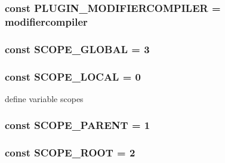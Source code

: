 \subsubsection[{P\+L\+U\+G\+I\+N\+\_\+\+M\+O\+D\+I\+F\+I\+E\+R\+C\+O\+M\+P\+I\+L\+E\+R}]{\setlength{\rightskip}{0pt plus 5cm}const P\+L\+U\+G\+I\+N\+\_\+\+M\+O\+D\+I\+F\+I\+E\+R\+C\+O\+M\+P\+I\+L\+E\+R = \textquotesingle{}modifiercompiler\textquotesingle{}}\label{class_smarty_a6d2292b274afbbc56b46bf0064257c21}
\hypertarget{class_smarty_ab445d8c60ac47e2eade1790d3b5ead7e}{}
\subsubsection[{S\+C\+O\+P\+E\+\_\+\+G\+L\+O\+B\+A\+L}]{\setlength{\rightskip}{0pt plus 5cm}const S\+C\+O\+P\+E\+\_\+\+G\+L\+O\+B\+A\+L = 3}\label{class_smarty_ab445d8c60ac47e2eade1790d3b5ead7e}
\hypertarget{class_smarty_ae96cd6e8d429b91e56cd1914c5b5ce61}{}
\subsubsection[{S\+C\+O\+P\+E\+\_\+\+L\+O\+C\+A\+L}]{\setlength{\rightskip}{0pt plus 5cm}const S\+C\+O\+P\+E\+\_\+\+L\+O\+C\+A\+L = 0}\label{class_smarty_ae96cd6e8d429b91e56cd1914c5b5ce61}
define variable scopes \hypertarget{class_smarty_a8ea89b5e55b135aa28fcccba189e3bca}{}
\subsubsection[{S\+C\+O\+P\+E\+\_\+\+P\+A\+R\+E\+N\+T}]{\setlength{\rightskip}{0pt plus 5cm}const S\+C\+O\+P\+E\+\_\+\+P\+A\+R\+E\+N\+T = 1}\label{class_smarty_a8ea89b5e55b135aa28fcccba189e3bca}
\hypertarget{class_smarty_a18f8c264effd9f09a2776427cbc2d005}{}
\subsubsection[{S\+C\+O\+P\+E\+\_\+\+R\+O\+O\+T}]{\setlength{\rightskip}{0pt plus 5cm}const S\+C\+O\+P\+E\+\_\+\+R\+O\+O\+T = 2}\label{class_smarty_a18f8c264effd9f09a2776427cbc2d005}
\hypertarget{class_smarty_a38a3b7b2e496b24a1bf2976ac1552ed7}{}
